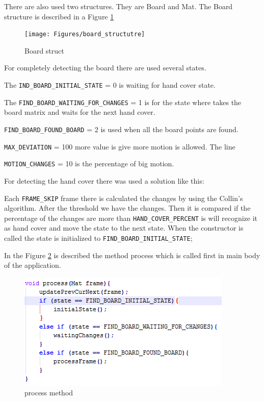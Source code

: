 	
There are also used two structures. They are Board and Mat. The Board structure is described in a Figure \ref{fig:board_structutre}

\begin{figure}[h]
    \centering
    \texttt{[image: Figures/board\_structutre]}
    \caption{Board struct}
    \label{fig:board_structutre}
\end{figure}

For completely detecting the board there are used several states. 

The \verb|IND_BOARD_INITIAL_STATE| = 0 is waiting for hand cover state. 

The \verb|FIND_BOARD_WAITING_FOR_CHANGES| = 1 is for the state where takes the board matrix and waits for the next hand cover. 

\verb|FIND_BOARD_FOUND_BOARD| = 2 is used when all the board points are found.

\verb|MAX_DEVIATION| = 100 more value is give more motion is allowed. The line

\verb|MOTION_CHANGES| = 10 is the percentage of big motion.

For detecting the hand cover there was used a solution like this: 

Each \verb|FRAME_SKIP| frame there is calculated the changes by using the Collin’s algorithm. After the threshold we have the changes. Then it is compared if the percentage of the changes are more than \verb|HAND_COVER_PERCENT| is will recognize it as hand cover and move the state to the next state. When the constructor is called the state is initialized to \verb|FIND_BOARD_INITIAL_STATE|;

In the Figure \ref{fig:process_method} is described the method process which is called first in main body of the application. 

\begin{figure}[h]
    \centering
    \includegraphics[]{Figures/process_method}
    \caption{process method}
    \label{fig:process_method}
\end{figure}


